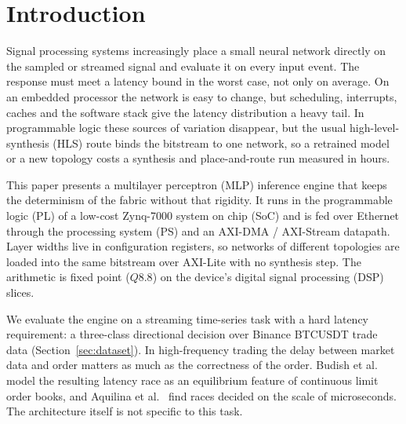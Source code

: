 \documentclass[pdflatex,sn-mathphys-num,iicol]{sn-jnl}
\begin{document}
\maketitle

\section{Introduction}
Signal processing systems increasingly place a small neural network directly
on the sampled or streamed signal and evaluate it on every input event. The
response must meet a latency bound in the worst case, not only on average. On an
embedded processor the network is easy to change, but scheduling, interrupts,
caches and the software stack give the latency distribution a heavy tail. In
programmable logic these sources of variation disappear, but the usual
high-level-synthesis (HLS) route binds the bitstream to one network, so a
retrained model or a new topology costs a synthesis and place-and-route run
measured in hours.

This paper presents a multilayer perceptron (MLP) inference engine that keeps
the determinism of the fabric without that rigidity. It runs in the
programmable logic (PL) of a low-cost Zynq-7000 system on chip (SoC) and is fed
over Ethernet through the processing system (PS) and an AXI-DMA / AXI-Stream
datapath. Layer widths live in configuration registers, so networks of
different topologies are loaded into the same bitstream over AXI-Lite with no
synthesis step. The arithmetic is fixed point ($Q8.8$) on the device's digital
signal processing (DSP) slices.

We evaluate the engine on a streaming time-series task with a hard latency
requirement: a three-class directional decision over Binance BTCUSDT trade data
(Section~\ref{sec:dataset}). In high-frequency trading the delay between market
data and order matters as much as the correctness of the order. Budish et
al.~\cite{Budish2015} model the resulting latency race as an equilibrium
feature of continuous limit order books, and Aquilina et al.~\cite{Aquilina2022}
find races decided on the scale of microseconds. The architecture itself is not
specific to this task.
\end{document}

